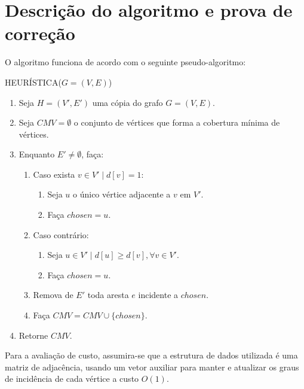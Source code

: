 \section{Descrição do algoritmo e prova de correção}
\label{sec:descricao-algoritmo}

O algoritmo funciona de acordo com o seguinte pseudo-algoritmo:

HEURÍSTICA($G = (V, E)$)
\begin{enumerate}
    \item Seja $H = (V', E')$ uma cópia do grafo $G= (V, E)$.
    \item Seja $CMV = \emptyset$ o conjunto de vértices que forma a
    cobertura mínima de vértices.
    \item Enquanto $E' \ne \emptyset$, faça:
    \label{item:loop}

    \begin{enumerate}
        \item Caso exista $v \in V' \mid d[v] = 1$:
        \label{item:alone}

        \begin{enumerate}
            \item Seja $u$ o único vértice adjacente a $v$ em $V'$.
            \label{item:find}

            \item Faça $chosen = u$.
        \end{enumerate}
        \item Caso contrário:
        \begin{enumerate}
            \item Seja $u \in V' \mid d[u] \ge d[v], \forall v \in
            V'$.
            \label{item:max}

            \item Faça $chosen = u$.
        \end{enumerate}
        \item Remova de $E'$ toda aresta $e$ incidente a $chosen$.
        \label{item:remove}

        \item Faça $CMV = CMV \cup \{chosen\}$.
    \end{enumerate}
    \item Retorne $CMV$.
\end{enumerate}

Para a avaliação de custo, assumira-se que a estrutura de dados
utilizada é uma matriz de adjacência, usando um vetor auxiliar para
manter e atualizar os graus de incidência de cada vértice a custo
$O(1)$.

